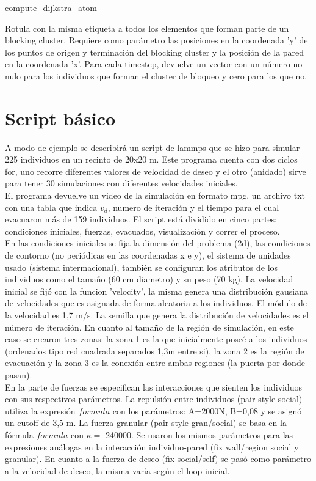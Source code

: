 {\Large compute\_dijkstra\_atom}

Rotula con la misma etiqueta a todos los elementos que forman parte de un blocking cluster. Requiere como parámetro las posiciones en la coordenada 'y' de los puntos de origen y terminación del blocking cluster y la posición de la pared en la coordenada 'x'. Para cada timestep, devuelve un vector con un número no nulo para los individuos que forman el cluster de bloqueo y cero para los que no. 

\section{Script básico}

A modo de ejemplo se describirá un script de lammps que se hizo para simular 225 individuos en un recinto de 20x20 m. Este programa cuenta con dos ciclos for, uno recorre diferentes valores de velocidad de deseo y el otro (anidado) sirve para tener 30 simulaciones con diferentes velocidades iniciales. \\
El programa devuelve un video de la simulación en formato mpg, un archivo txt con una tabla que indica $v_d$, numero de iteración y el tiempo para el cual evacuaron más de 159 individuos.
El script está dividido en cinco partes: condiciones iniciales, fuerzas, evacuados, visualización y correr el proceso.\\ 
En las condiciones iniciales se fija la dimensión del problema (2d), las condiciones de contorno (no periódicas en las coordenadas x e y), el sistema de unidades usado (sistema intermacional), también se configuran los atributos de los individuos como el tamaño (60 cm diametro) y su peso (70 kg). La velocidad inicial se fijó con la funcion 'velocity', la misma genera una distribución gausiana de velocidades que es asignada de forma aleatoria a los individuos. El módulo de la velocidad es 1,7 m/s. La semilla que genera la distribución de velocidades es el número de iteración.
En cuanto al tamaño de la región de simulación, en este caso se crearon tres zonas: la zona 1 es la que inicialmente poseé a los individuos (ordenados tipo red cuadrada separados 1,3m entre si), la zona 2 es la región de evacuación y la zona 3 es la conexión entre ambas regiones (la puerta por donde pasan).\\
En la parte de fuerzas se especifican las interacciones que sienten los individuos con sus respectivos parámetros. La repulsión entre individuos (pair style social) utiliza la expresión $formula$ con los parámetros: A=2000N, B=0,08 y se asignó un cutoff de 3,5 m. La fuerza granular (pair style gran/social) se basa en la fórmula $formula$ con $\kappa =$ 240000. Se usaron los mismos parámetros para las expresiones análogas en la interacción individuo-pared (fix wall/region social y granular). En cuanto a la fuerza de deseo (fix social/self) se pasó como parámetro a la velocidad de deseo, la misma varía según el loop inicial. \\
